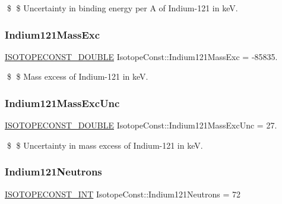 \$ \$ Uncertainty in binding energy per A of Indium-\/121 in keV. \mbox{\label{group___isotope_const-_indium-_in121_gaef09ade440005e4a8fae780f7faa6cdc}} 
\subsubsection{\texorpdfstring{Indium121\+Mass\+Exc}{Indium121MassExc}}
{\footnotesize\ttfamily \mbox{\hyperlink{group___isotope_const-_macros_ga8f45a7272ce02c0b4c65c44636ed719a}{I\+S\+O\+T\+O\+P\+E\+C\+O\+N\+S\+T\+\_\+\+D\+O\+U\+B\+LE}} Isotope\+Const\+::\+Indium121\+Mass\+Exc = -\/85835.}

\$ \$ Mass excess of Indium-\/121 in keV. \mbox{\label{group___isotope_const-_indium-_in121_ga3169df75207ae545e622e50344df726b}} 
\subsubsection{\texorpdfstring{Indium121\+Mass\+Exc\+Unc}{Indium121MassExcUnc}}
{\footnotesize\ttfamily \mbox{\hyperlink{group___isotope_const-_macros_ga8f45a7272ce02c0b4c65c44636ed719a}{I\+S\+O\+T\+O\+P\+E\+C\+O\+N\+S\+T\+\_\+\+D\+O\+U\+B\+LE}} Isotope\+Const\+::\+Indium121\+Mass\+Exc\+Unc = 27.}

\$ \$ Uncertainty in mass excess of Indium-\/121 in keV. \mbox{\label{group___isotope_const-_indium-_in121_gaf1c797ffd1ddfed365df001007818531}} 
\subsubsection{\texorpdfstring{Indium121\+Neutrons}{Indium121Neutrons}}
{\footnotesize\ttfamily \mbox{\hyperlink{group___isotope_const-_macros_ga5f18360b3e99483a35c32d789e62621c}{I\+S\+O\+T\+O\+P\+E\+C\+O\+N\+S\+T\+\_\+\+I\+NT}} Isotope\+Const\+::\+Indium121\+Neutrons = 72}

